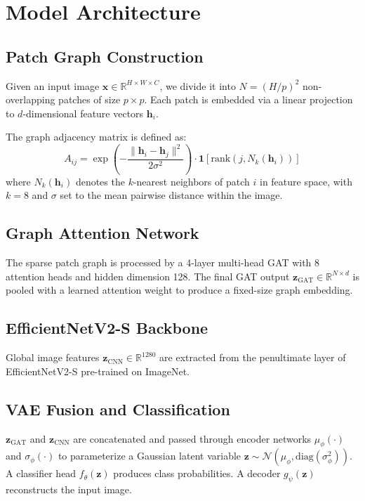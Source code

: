 \documentclass[conference]{IEEEtran}
\begin{document}
\section{Model Architecture}

\subsection{Patch Graph Construction}
Given an input image $\mathbf{x} \in \mathbb{R}^{H \times W \times C}$, we divide it into $N = (H/p)^2$ non-overlapping patches of size $p \times p$. Each patch is embedded via a linear projection to $d$-dimensional feature vectors $\mathbf{h}_i$.

The graph adjacency matrix is defined as:
\begin{equation}
A_{ij} = \exp\left(-\frac{\|\mathbf{h}_i - \mathbf{h}_j\|^2}{2\sigma^2}\right) \cdot \mathbf{1}[\text{rank}(j, N_k(\mathbf{h}_i))]
\end{equation}
where $N_k(\mathbf{h}_i)$ denotes the $k$-nearest neighbors of patch $i$ in feature space, with $k=8$ and $\sigma$ set to the mean pairwise distance within the image.

\subsection{Graph Attention Network}
The sparse patch graph is processed by a 4-layer multi-head GAT \cite{velickovic2017graph} with 8 attention heads and hidden dimension 128. The final GAT output $\mathbf{z}_{\text{GAT}} \in \mathbb{R}^{N \times d}$ is pooled with a learned attention weight to produce a fixed-size graph embedding.

\subsection{EfficientNetV2-S Backbone}
Global image features $\mathbf{z}_{\text{CNN}} \in \mathbb{R}^{1280}$ are extracted from the penultimate layer of EfficientNetV2-S pre-trained on ImageNet.

\subsection{VAE Fusion and Classification}
$\mathbf{z}_{\text{GAT}}$ and $\mathbf{z}_{\text{CNN}}$ are concatenated and passed through encoder networks $\mu_\phi(\cdot)$ and $\sigma_\phi(\cdot)$ to parameterize a Gaussian latent variable $\mathbf{z} \sim \mathcal{N}(\mu_\phi, \text{diag}(\sigma^2_\phi))$. A classifier head $f_\theta(\mathbf{z})$ produces class probabilities. A decoder $g_\psi(\mathbf{z})$ reconstructs the input image.
\end{document}
